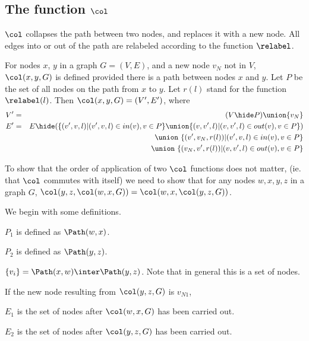 \subsection{The function $\col$}

$\col$ collapses the path between two nodes, and replaces it with a new node. All edges into or out of the path are relabeled according to the function $\relabel$.

  
\begin{definition}[$\col$]
  \label{def:col}
  For nodes $x$, $y$ in a graph $G = (V,E)$, and a new node $v_{N}$ not in $V$,  $\col(x,y,G)$ is defined provided there is a path between nodes $x$ and $y$. Let $P$ be the set of all nodes on the path from $x$ to $y$. Let $r(l)$ stand for the function $\relabel(l)$. Then $\col(x,y,G) =  (V',E')$, where 
  \begin{eqnarray*}
  V' & = & (V\hide P) \union \{v_N\}     \\
  E' & = & E\hide (
                   \{(v',v,l)|(v',v,l) \in in(v), v\in P\}
                   \union
                   \{(v,v',l)|(v,v',l) \in out(v), v\in P\}
                  )\\
  && \union\ \{(v',v_{N},r(l))|(v',v,l) \in in(v), v\in P\}\\
  && \union\ \{(v_{N},v',r(l))|(v,v',l) \in out(v), v\in P\}\\
  \end{eqnarray*}

\end{definition}

To show that  the order of application of two $\col$ functions does not matter, (ie. that $\col$ commutes with itself)  we need to show that for any nodes $w,x,y,z$ in a graph $G$, $\col(y,z,\col(w,x,G)) = \col(w,x,\col(y,z,G))$. 


We begin with some definitions.

$P_1$ is defined as $\Path(w,x)$.

$P_2$ is defined as $\Path(y,z)$.

$\{v_i\} = \Path(x,w) \inter \Path(y,z)$. Note that in general this is a set of nodes. 

 If the new node resulting from $\col(y,z,G)$ is $v_{N1}$,

$E_1$ is the set of nodes after $\col(w,x,G)$ has been carried out.

$E_2$ is the set of nodes after $\col(y,z,G)$ has been carried out.

